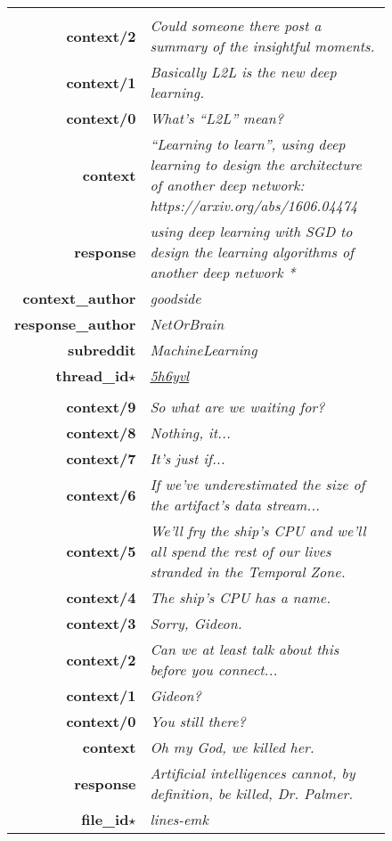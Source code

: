 \documentclass[11pt,a4paper,table]{article}
\begin{document}
\begin{figure}[htb]
    \centering
    {
        \small
        \begin{tabular}{>{\bfseries}r >{\itshape}p{100mm}}
 \\
          context/2 & Could someone there post a summary of the insightful moments. \\
          context/1 & Basically L2L is the new deep learning. \\
          context/0 & What's ``L2L'' mean? \\
          context & ``Learning to learn'', using deep learning to design the architecture of another deep network: https://arxiv.org/abs/1606.04474 \\
          response & using deep learning with SGD to design the learning algorithms of another deep network   * \\[1ex]
          context\_author & goodside \\
          response\_author & NetOrBrain \\
          subreddit & MachineLearning \\
          thread\_id$\star$ & \href{https://www.reddit.com/r/MachineLearning/comments/5h6yvl/d_recurrent_neural_networks_and_other_machines/daz60rv/?context=8&depth=9}{5h6yvl} \\
          \midrule
          
           \\
          context/9 & So what are we waiting for? \\
          context/8 & Nothing, it... \\
          context/7 & It's just if... \\
          context/6 & If we've underestimated the size of the artifact's data stream... \\
          context/5 & We'll fry the ship's CPU and we'll all spend the rest of our lives stranded in the Temporal Zone. \\
          context/4 & The ship's CPU has a name. \\
          context/3 & Sorry, Gideon. \\
          context/2 & Can we at least talk about this before you connect... \\
          context/1 & Gideon? \\
          context/0 & You still there? \\
          context & Oh my God, we killed her. \\
          response & Artificial intelligences cannot, by definition, be killed, Dr. Palmer. \\[1ex]
          file\_id$\star$ & lines-emk \\
          \midrule
          

\end{tabular}}
\end{figure}
\end{document}
